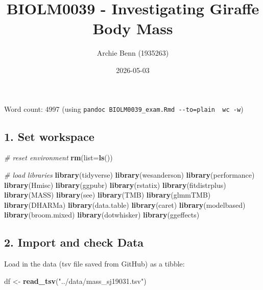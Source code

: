 \documentclass[
]{article}
\title{BIOLM0039 - Investigating Giraffe Body Mass}
\author{Archie Benn (1935263)}
\date{2026-05-03}
\newenvironment{Shaded}{\begin{snugshade}}{\end{snugshade}}
\newcommand{\AttributeTok}[1]{\textcolor[rgb]{0.13,0.29,0.53}{#1}}
\newcommand{\CommentTok}[1]{\textcolor[rgb]{0.56,0.35,0.01}{\textit{#1}}}
\newcommand{\FunctionTok}[1]{\textcolor[rgb]{0.13,0.29,0.53}{\textbf{#1}}}
\newcommand{\NormalTok}[1]{#1}
\newcommand{\OtherTok}[1]{\textcolor[rgb]{0.56,0.35,0.01}{#1}}
\newcommand{\StringTok}[1]{\textcolor[rgb]{0.31,0.60,0.02}{#1}}
\begin{document}
\maketitle

Word count: 4997 (using
\texttt{pandoc\ BIOLM0039\_exam.Rmd\ -\/-to=plain\ \textbar{}\ wc\ -w})

\subsection{1. Set workspace}\label{set-workspace}

\begin{Shaded}
\begin{Highlighting}[]
\CommentTok{\# reset environment}
\FunctionTok{rm}\NormalTok{(}\AttributeTok{list=}\FunctionTok{ls}\NormalTok{())}

\CommentTok{\# load libraries}
\FunctionTok{library}\NormalTok{(tidyverse)}
\FunctionTok{library}\NormalTok{(wesanderson)}
\FunctionTok{library}\NormalTok{(performance)}
\FunctionTok{library}\NormalTok{(Hmisc)}
\FunctionTok{library}\NormalTok{(ggpubr)}
\FunctionTok{library}\NormalTok{(rstatix)}
\FunctionTok{library}\NormalTok{(fitdistrplus)}
\FunctionTok{library}\NormalTok{(MASS)}
\FunctionTok{library}\NormalTok{(see)}
\FunctionTok{library}\NormalTok{(TMB)}
\FunctionTok{library}\NormalTok{(glmmTMB)}
\FunctionTok{library}\NormalTok{(DHARMa)}
\FunctionTok{library}\NormalTok{(data.table)}
\FunctionTok{library}\NormalTok{(caret)}
\FunctionTok{library}\NormalTok{(modelbased)}
\FunctionTok{library}\NormalTok{(broom.mixed)}
\FunctionTok{library}\NormalTok{(dotwhisker)}
\FunctionTok{library}\NormalTok{(ggeffects)}
\end{Highlighting}
\end{Shaded}

\subsection{2. Import and check Data}\label{import-and-check-data}

Load in the data (tsv file saved from GitHub) as a tibble:

\begin{Shaded}
\begin{Highlighting}[]
\NormalTok{df }\OtherTok{\textless{}{-}} \FunctionTok{read\_tsv}\NormalTok{(}\StringTok{"../data/mass\_sj19031.tsv"}\NormalTok{)}
\end{Highlighting}
\end{Shaded}
\end{document}
